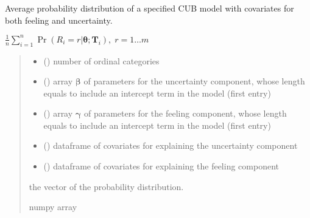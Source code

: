 \documentclass[letterpaper,10pt,english]{sphinxmanual}
\begin{document}
\begin{fulllineitems}
\label{\detokenize{cubmods:cubmods.cub_yw.pmf}}
\pysigstartsignatures
{}
\pysigstopsignatures
\sphinxAtStartPar
Average probability distribution of a specified CUB model 
with covariates for both feeling and uncertainty.

\sphinxAtStartPar
\(\frac{1}{n} \sum_{i=1}^n \Pr(R_i=r|\pmb\theta; \pmb T_i),\; r=1 \ldots m\)
\begin{quote}\begin{description}
\begin{itemize}
\item {} 
\sphinxAtStartPar
{} () \textendash{} number of ordinal categories

\item {} 
\sphinxAtStartPar
{} () \textendash{} array \(\pmb \beta\) of parameters for the uncertainty component, whose length equals 
 to include an intercept term in the model (first entry)

\item {} 
\sphinxAtStartPar
{} () \textendash{} array \(\pmb \gamma\) of parameters for the feeling component, whose length equals 
 to include an intercept term in the model (first entry)

\item {} 
\sphinxAtStartPar
{} () \textendash{} dataframe of covariates for explaining the uncertainty component

\item {} 
\sphinxAtStartPar
{} () \textendash{} dataframe of covariates for explaining the feeling component

\end{itemize}

\sphinxAtStartPar
the vector of the probability distribution.

\sphinxAtStartPar
numpy array

\end{description}\end{quote}

\end{fulllineitems}
\end{document}
